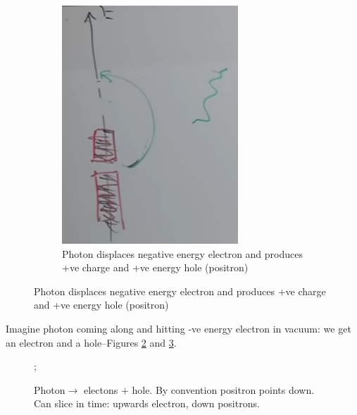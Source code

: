 \documentclass[]{article}
\begin{document}
\begin{figure}[H]
\begin{center}
\begin{subfigure}[t]{0.3\textwidth}
\begin{center}
			\end{center}
		\end{subfigure}
		\begin{subfigure}[t]{0.3\textwidth}
			\begin{center}
				\caption{Photon displaces negative energy electron and produces +ve charge and +ve energy hole (positron)}\label{fig:dirac:sea:photon}
				\includegraphics[width=\textwidth]{aqm-10-dirac-sea-photon}
			\end{center}
	\end{subfigure}
	\end{center}
\end{figure}

Imagine photon coming along and hitting -ve energy electron in vacuum: we get an electron and a hole--Figures \ref{fig:dirac:sea:photon} and \ref{photon:dirac}.

\begin{figure}[H]
	\begin{center}
		\caption[Photon$\rightarrow$ electrons + hole]{Photon$\rightarrow$ electons + hole. By convention positron points down. Can slice in time: upwards electron, down positrons.}\label{photon:dirac}
		;
	\end{center}
\end{figure}
\end{document}
